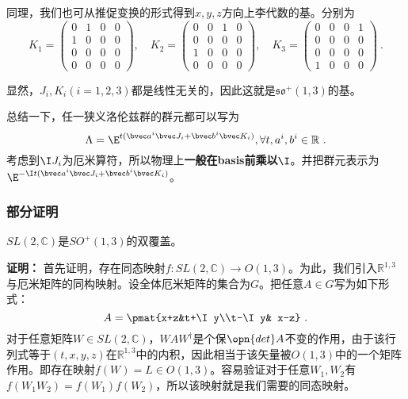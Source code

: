 同理，我们也可从推促变换的形式得到$x,y,z$方向上李代数的基。分别为
\begin{equation}
K_1=\begin{pmatrix}0&1&0&0\\1&0&0&0\\0&0&0&0\\0&0&0&0\end{pmatrix},\quad K_2=\begin{pmatrix}0&0&1&0\\0&0&0&0\\1&0&0&0\\0&0&0&0\end{pmatrix},\quad K_3=\begin{pmatrix}0&0&0&1\\0&0&0&0\\0&0&0&0\\1&0&0&0\end{pmatrix}~.
\end{equation}

显然，$J_i,K_i(i=1,2,3)$都是线性无关的，因此这就是$\mathfrak{so}^+
(1,3)$的基。

总结一下，任一狭义洛伦兹群的群元都可以写为
\begin{equation}\label{eq_qed1_10}
\Lambda =\E^{t(\bvec a^i\bvec J_i+\bvec b^i\bvec K_i)},\forall t,a^i,b^i\in\mathbb R~.
\end{equation}
考虑到$\I J_i$为厄米算符，所以物理上\textbf{一般在basis前乘以$\I$}。并把群元表示为$\E^{-\I t(\bvec a^i\bvec J_i+\bvec b^i\bvec K_i)}$。
\subsubsection{部分证明}
\begin{theorem}{}
$SL(2,\mathbb C)$是$SO^+(1,3)$的双覆盖。
\end{theorem}
\textbf{证明：}
首先证明，存在同态映射$f:SL(2,\mathbb C)\to O(1,3)$。为此，我们引入$\mathbb R^{1,3}$与厄米矩阵的同构映射。设全体厄米矩阵的集合为$G$。把任意$A\in G$写为如下形式：
\begin{equation}\label{eq_qed1_5}
A=\pmat{x+z&t+\I y\\t-\I y& x-z}~.
\end{equation}
对于任意矩阵$W\in SL(2,\mathbb C)$，$WAW^{\dagger}$是个保$\opn{det} A$不变的作用，由于该行列式等于$(t,x,y,z)$在$\mathbb R^{1,3}$中的内积，因此相当于该矢量被$O(1,3)$中的一个矩阵作用。即存在映射$f(W)=L\in O(1,3)$。容易验证对于任意$W_1,W_2$有$f(W_1W_2)=f(W_1)f(W_2)$，所以该映射就是我们需要的同态映射。

